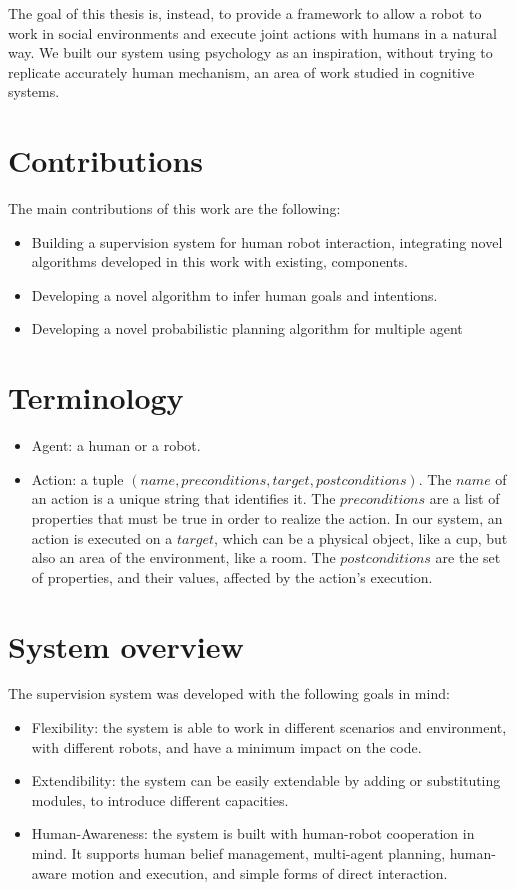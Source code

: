 The goal of this thesis is, instead, to provide a framework to allow a robot to work in social environments and execute joint actions with humans in a natural way. We built our system using psychology as an inspiration, without trying to replicate accurately human mechanism, an area of work studied in cognitive systems. 

\section{Contributions}

The main contributions of this work are the following:
\begin{itemize}
\item Building a supervision system for human robot interaction, integrating novel algorithms developed in this work with existing, components.
\item Developing a novel algorithm to infer human goals and intentions.
\item Developing a novel probabilistic planning algorithm for multiple agent    
\end{itemize}

\section{Terminology}
\begin{itemize}
\item Agent: a human or a robot.
\item Action:  a tuple $(name, preconditions, target, postconditions)$. The $name$ of an action is a unique string that identifies it. The $preconditions$ are a list of properties that must be true in order to realize the action. In our system, an action is executed on a $target$, which can be a physical object, like a cup, but also an area of the environment, like a room. The $postconditions$ are the set of properties, and their values, affected by the action's execution.
\end{itemize}

\section{System overview}
The supervision system was developed with the following goals in mind:
\begin{itemize}
\item Flexibility: the system is able to work in different scenarios and environment, with different robots, and have a minimum impact on the code.  
\item Extendibility: the system can be easily extendable by adding or substituting modules, to introduce different capacities.
\item Human-Awareness: the system is built with human-robot cooperation in mind. It supports human belief management, multi-agent planning, human-aware motion and execution, and simple forms of direct interaction.
\end{itemize}

